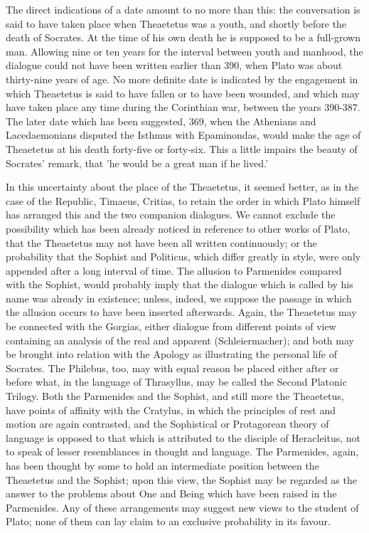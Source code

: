 The direct indications of a date amount to no more than this: the
conversation is said to have taken place when Theaetetus was a youth,
and shortly before the death of Socrates. At the time of his own death
he is supposed to be a full-grown man. Allowing nine or ten years for
the interval between youth and manhood, the dialogue could not have been
written earlier than 390, when Plato was about thirty-nine years of age.
No more definite date is indicated by the engagement in which Theaetetus
is said to have fallen or to have been wounded, and which may have taken
place any time during the Corinthian war, between the years 390-387.
The later date which has been suggested, 369, when the Athenians and
Lacedaemonians disputed the Isthmus with Epaminondas, would make the
age of Theaetetus at his death forty-five or forty-six. This a little
impairs the beauty of Socrates' remark, that 'he would be a great man if
he lived.'

In this uncertainty about the place of the Theaetetus, it seemed better,
as in the case of the Republic, Timaeus, Critias, to retain the order in
which Plato himself has arranged this and the two companion dialogues.
We cannot exclude the possibility which has been already noticed in
reference to other works of Plato, that the Theaetetus may not have
been all written continuously; or the probability that the Sophist and
Politicus, which differ greatly in style, were only appended after a
long interval of time. The allusion to Parmenides compared with the
Sophist, would probably imply that the dialogue which is called by his
name was already in existence; unless, indeed, we suppose the passage in
which the allusion occurs to have been inserted afterwards. Again,
the Theaetetus may be connected with the Gorgias, either dialogue from
different points of view containing an analysis of the real and apparent
(Schleiermacher); and both may be brought into relation with the Apology
as illustrating the personal life of Socrates. The Philebus, too, may
with equal reason be placed either after or before what, in the language
of Thrasyllus, may be called the Second Platonic Trilogy. Both the
Parmenides and the Sophist, and still more the Theaetetus, have points
of affinity with the Cratylus, in which the principles of rest and
motion are again contrasted, and the Sophistical or Protagorean theory
of language is opposed to that which is attributed to the disciple
of Heracleitus, not to speak of lesser resemblances in thought and
language. The Parmenides, again, has been thought by some to hold an
intermediate position between the Theaetetus and the Sophist; upon this
view, the Sophist may be regarded as the answer to the problems about
One and Being which have been raised in the Parmenides. Any of these
arrangements may suggest new views to the student of Plato; none of them
can lay claim to an exclusive probability in its favour.

